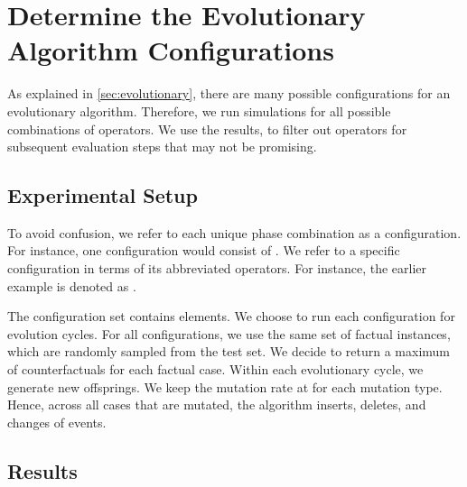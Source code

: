 \documentclass[./../../paper.tex]{subfiles}
\begin{document}
\section{Determine the Evolutionary Algorithm Configurations}
As explained in \autoref{sec:evolutionary}, there are many possible configurations for an evolutionary algorithm. Therefore, we run simulations for all possible combinations of operators. We use the results, to filter out operators for subsequent evaluation steps that may not be promising.

\subsection{Experimental Setup}
\label{sec:exp1}
 To avoid confusion, we refer to each unique phase combination as a configuration. For instance, one configuration would consist of . We refer to a specific configuration in terms of its abbreviated operators. For instance, the earlier example is denoted as .

The configuration set contains  elements. We choose to run each configuration for  evolution cycles. For all configurations, we use the same set of  factual \glspl{instance}, which are randomly sampled from the test set. We decide to return a maximum of  counterfactuals for each factual case. Within each evolutionary cycle, we generate  new offsprings. We keep the mutation rate at  for each mutation type. Hence, across all cases that are mutated, the algorithm inserts, deletes, and changes  of events. 


\subsection{Results}
\end{document}
